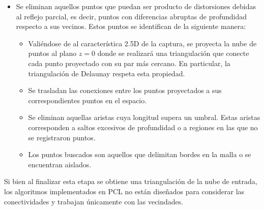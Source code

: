 \begin{itemize}
	\item Se eliminan aquellos puntos que puedan ser producto de distorsiones debidas al reflejo parcial,
        es decir, puntos con diferencias abruptas de profundidad respecto a sus vecinos.
		Estos puntos se identifican de la siguiente manera:
		\begin{itemize}
            \item Valiéndose de al característica 2.5D de la captura,
                se proyecta la nube de puntos al plano $z=0$
                donde se realizará una triangulación que conecte cada punto proyectado
                con su par más cercano.
                En particular, la triangulación de Delaunay respeta esta propiedad\cite{Dickerson96algorithmsfor}.

            \item Se trasladan las conexiones entre los puntos proyectados
                a sus correspondientes puntos en el espacio.

			\item Se eliminan aquellas aristas cuya longitud supera un umbral.
				Estas aristas corresponden a saltos excesivos de profundidad
				o a regiones en las que no se registraron puntos.
			\item Los puntos buscados son aquellos que delimitan bordes en la malla o se encuentran aislados.   %
		\end{itemize}
\end{itemize}

Si bien al finalizar esta etapa se obtiene una triangulación de la nube de entrada,
los algoritmos implementados en PCL no están diseñados para considerar las conectividades y trabajan únicamente con las vecindades.


